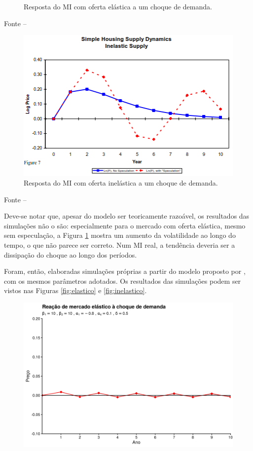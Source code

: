 \documentclass[
	12pt,				%
	oneside,			%
	a4paper,			%
	chapter=TITLE,		%
	section=TITLE,		%
	english,			%
	brazil				%
	]{abntex2}
\newcommand{\bcenter}{\begin{center}}
\newcommand{\ecenter}{\end{center}}
\begin{document}
\begin{refsection}
\begin{figure}[H]
{}

\caption{Resposta do \gls{MI} com oferta elástica a um choque de demanda.}\label{fig:TheRole1}
\end{figure}
\bcenter

\small Fonte -- \textcite[p.~24]{Malpezzi2002TheRO}
\ecenter
\begin{figure}[H]

{\centering \includegraphics[width=0.7\linewidth]{images/TheRole_2} 

}

\caption{Resposta do \gls{MI} com oferta inelástica a um choque de demanda.}\label{fig:TheRole2}
\end{figure}
\bcenter

\small Fonte -- \textcite[p.~24]{Malpezzi2002TheRO}
\ecenter

Deve-se notar que, apesar do modelo ser teoricamente razoável, os resultados das
simulações não o são: especialmente para o mercado com oferta elástica, mesmo
sem especulação, a Figura \ref{fig:TheRole1} mostra um aumento da volatilidade
ao longo do tempo, o que não parece ser correto. Num \gls{MI} real, a tendência
deveria ser a dissipação do choque ao longo dos períodos.

Foram, então, elaboradas simulações próprias a partir do modelo proposto por
\textcite{Malpezzi2002TheRO}, com os mesmos parâmetros adotados. Os resultados das
simulações podem ser vistos nas Figuras \ref{fig:elastico} e
\ref{fig:inelastico}.
\begin{figure}[H]

{\centering \includegraphics[width=0.7\linewidth]{images/elastico-1} 

}
\end{figure}
\end{refsection}
\end{document}
